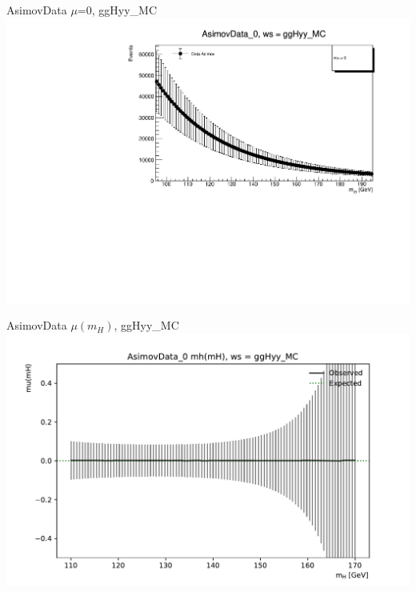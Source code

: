 \documentclass[10pt,UKenglish, leqno, xcolor = dvipsnames]{beamer}
\begin{document}
		\begin{frame}{AsimovData $\mu$=0, ggHyy\_MC}
			\vfill
			\includegraphics[width=1.\textwidth]{../images/AsimovData_0_ggHyy_MC.pdf}
			\vfill
		\end{frame}
		
		\begin{frame}{AsimovData $\mu(m_H)$, ggHyy\_MC}
			\vfill
			\includegraphics[width=1.\textwidth]{../images/mu_AsimovData_0_ggHyy_MC_plot.pdf}
			\vfill
		\end{frame}
		
\end{document}
